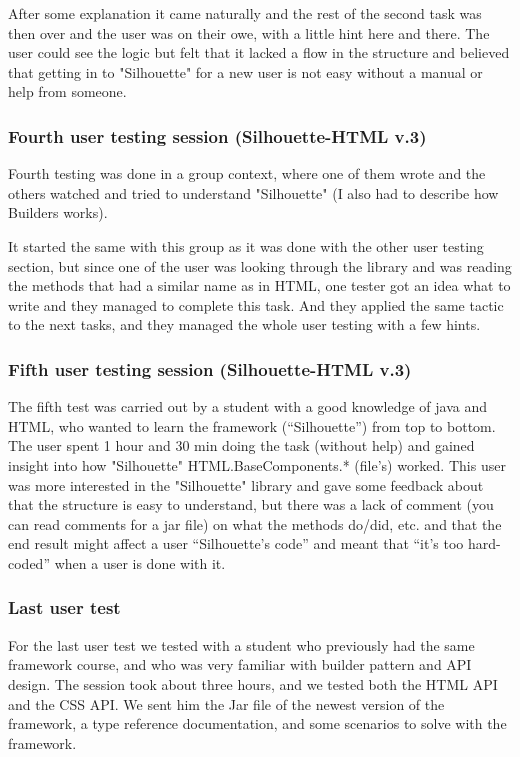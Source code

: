 \documentclass[12pt]{article}
\begin{document}
        After some explanation it came naturally and the rest of the second task was then over and the user was on their owe, with a little hint here and there. The user could see the logic but felt that it lacked a flow in the structure and believed that getting in to "Silhouette" for a new user is not easy without a manual or help from someone.
        
        \subsubsection{Fourth user testing session (Silhouette-HTML v.3)}

        Fourth testing was done in a group context, where one of them wrote and the others watched and tried to understand "Silhouette" (I also had to describe how Builders works).

        It started the same with this group as it was done with the other user testing section, but since one of the user was looking through the library and was reading the methods that had a similar name as in HTML, one tester got an idea what to write and they managed to complete this task. And they applied the same tactic to the next tasks, and they managed the whole user testing with a few hints. 

        \subsubsection{Fifth user testing session (Silhouette-HTML v.3)}

        The fifth test was carried out by a student with a good knowledge of java and HTML, who wanted to learn the framework (“Silhouette”) from top to bottom. The user spent 1 hour and 30 min doing the task (without help) and gained insight into how "Silhouette" HTML.BaseComponents.* (file's) worked. This user was more interested in the "Silhouette" library and gave some feedback about that the structure is easy to understand, but there was a lack of comment (you can read comments for a jar file) on what the methods do/did, etc. and that the end result might affect a user “Silhouette’s code” and meant that “it’s too hard-coded” when a user is done with it.

        \subsubsection{Last user test}

        For the last user test we tested with a student who previously had the same framework course, and who was very familiar with builder pattern and API design. The session took about three hours, and we tested both the HTML API and the CSS API. We sent him the Jar file of the newest version of the framework, a type reference documentation, and some scenarios to solve with the framework.
\end{document}
